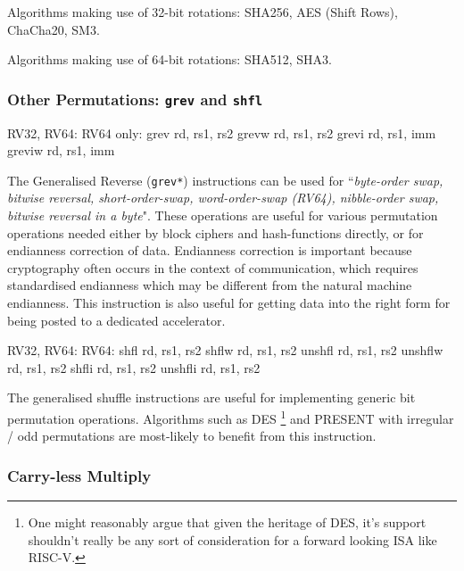 Algorithms making use of 32-bit rotations:
SHA256, AES (Shift Rows), ChaCha20, SM3.

Algorithms making use of 64-bit rotations:
SHA512, SHA3.

\subsubsection{Other Permutations: {\tt grev} and {\tt shfl}}

\begin{cryptobitmanipisa}
RV32, RV64:                         RV64 only:
    grev rd, rs1, rs2                   grevw rd, rs1, rs2
    grevi rd, rs1, imm                  greviw rd, rs1, imm
\end{cryptobitmanipisa}

The Generalised Reverse ({\tt grev*}) instructions can be used for 
``{\em byte-order swap, bitwise reversal, short-order-swap,
word-order-swap (RV64), nibble-order swap, bitwise reversal in a byte}".
These operations are useful for various permutation operations
needed either by block ciphers and hash-functions directly, or for
endianness correction of data.
Endianness correction is important because
cryptography often occurs in the context of communication, which requires
standardised endianness which may be different from the natural machine
endianness.
This instruction is also useful for getting data into the right form
for being posted to a dedicated accelerator.

\begin{cryptobitmanipisa}
RV32, RV64:                         RV64:
    shfl    rd, rs1, rs2                shflw   rd, rs1, rs2
    unshfl  rd, rs1, rs2                unshflw rd, rs1, rs2
    shfli   rd, rs1, rs2
    unshfli rd, rs1, rs2
\end{cryptobitmanipisa}

The generalised shuffle instructions are useful for implementing
generic bit permutation operations.
Algorithms such as 
DES \footnote{
One might reasonably argue that given the heritage of DES, it's support
shouldn't really be any sort of consideration for a forward looking
ISA like RISC-V.
}
and
PRESENT\cite{block:present} with
irregular / odd permutations are most-likely to benefit from this
instruction.

\subsubsection{Carry-less Multiply}


